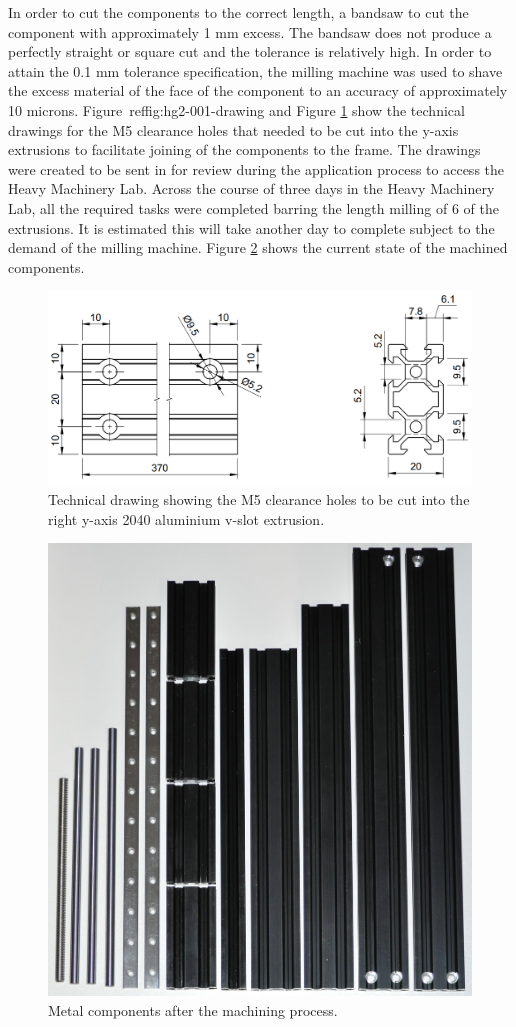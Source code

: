 In order to cut the components to the correct length, a bandsaw to cut the component with approximately 1 mm excess. The bandsaw does not produce a perfectly straight or square cut and the tolerance is relatively high. In order to attain the 0.1 mm tolerance specification, the milling machine was used to shave the excess material of the face of the component to an accuracy of approximately 10 microns. Figure\ ref{fig:hg2-001-drawing} and Figure \ref{fig:hg2-002-drawing} show the technical drawings for the M5 clearance holes that needed to be cut into the y-axis extrusions to facilitate joining of the components to the frame. The drawings were created to be sent in for review during the application process to access the Heavy Machinery Lab. Across the course of three days in the Heavy Machinery Lab, all the required tasks were completed barring the length milling of 6 of the extrusions. It is estimated this will take another day to complete subject to the demand of the milling machine. Figure \ref{fig:machined-components} shows the current state of the machined components.

\begin{figure}[H]
	\centering
	\includegraphics[width=0.7\linewidth]{figures/hg2-002-drawing.png}
	\caption{Technical drawing showing the M5 clearance holes to be cut into the right y-axis 2040 aluminium v-slot extrusion.}
	\label{fig:hg2-002-drawing}
\end{figure}

\begin{figure}[H]
	\centering
	\includegraphics[width=0.5\linewidth]{figures/machined-components.JPG}
	\caption{Metal components after the machining process.}
	\label{fig:machined-components}
\end{figure}

